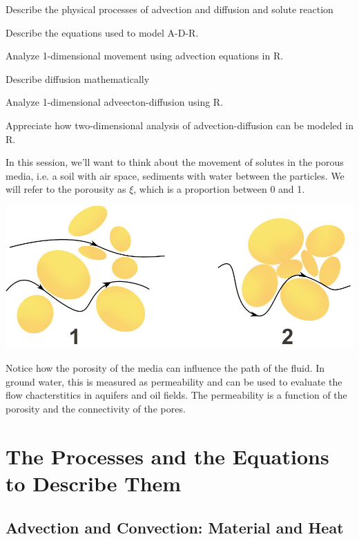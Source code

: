 \documentclass{tufte-handout}\usepackage[]{graphicx}\usepackage[]{xcolor}
\newenvironment{enumerate*}%
  {\begin{enumerate}%
    \setlength{\itemsep}{0pt}%
    \setlength{\parskip}{0pt}}%
  {\end{enumerate}}
\begin{document}
\begin{enumerate*}
	\item Describe the physical processes of advection and diffusion and solute reaction
	\item Describe the equations used to model A-D-R. 
	\item Analyze 1-dimensional movement using advection equations in R.
	\item Describe diffusion mathematically
	\item Analyze 1-dimensional adveecton-diffusion using R.
	\item Appreciate how two-dimensional analysis of advection-diffusion can be modeled in R.
\end{enumerate*}

In this session, we'll want to think about the movement of solutes in the porous media, i.e. a soil with air space, sediments with water between the particles. We will refer to the porousity as $\xi$, which is a proportion between 0 and 1. 

\begin{marginfigure}
\centering
\includegraphics{graphics/Darcy_permeability.jpg}
\caption{Notice how the porosity of the media can influence the path of the fluid. In ground water, this is measured as permeability and can be used to evaluate the flow chacterstitics in aquifers and oil fields. The permeability is a function of the porosity and the connectivity of the pores.}
\end{marginfigure}


\section{The Processes and the Equations to Describe Them}

\subsection{Advection and Convection: Material and Heat}
\end{document}
